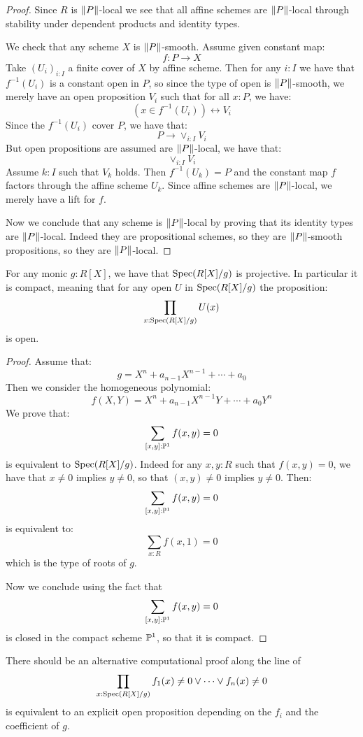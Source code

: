 \begin{proof}
Since $R$ is $\lVert P \rVert$-local we see that all affine schemes are $\lVert P \rVert$-local through stability under dependent products and identity types.

We check that any scheme $X$ is $\lVert P \rVert$-smooth. Assume given constant map:
\[f:P\to X\]
Take $(U_i)_{i:I}$ a finite cover of $X$ by affine scheme. Then for any $i:I$ we have that $f^{-1}(U_i)$ is a constant open in $P$, so since the type of open is $\lVert P \rVert$-smooth, we merely have an open proposition $V_i$ such that for all $x:P$, we have:
\[(x\in f^{-1}(U_i) )\leftrightarrow V_i\]
Since the $f^{-1}(U_i)$ cover $P$, we have that:
\[P\to \lor_{i:I} V_i\]
But open propositions are assumed are $\lVert P \rVert$-local, we have that:
\[ \lor_{i:I} V_i\]
Assume $k:I$ such that $V_k$ holds. Then $f^{-1}(U_k) = P$ and the constant map $f$ factors through the affine scheme $U_k$. Since affine schemes are $\lVert P \rVert$-local, we merely have a lift for $f$.

Now we conclude that any scheme is $\lVert P \rVert$-local by proving that its identity types are $\lVert P \rVert$-local. Indeed they are propositional schemes, so they are $\lVert P \rVert$-smooth propositions, so they are $\lVert P \rVert$-local.
\end{proof}

\begin{lemma}\label{roots-monic-proper}
For any monic $g:R[X]$, we have that $\operatorname{Spec}(R[X]/g)$ is projective. In particular it is compact, meaning that for any open $U$ in $\operatorname{Spec}(R[X]/g)$ the proposition:
\[\prod_{x:\operatorname{Spec}(R[X]/g)}U(x)\]
is open.
\end{lemma}

\begin{proof}
Assume that:
\[g=X^n+a_{n-1}X^{n-1}+\cdots+a_0\]
Then we consider the homogeneous polynomial:
\[f(X,Y) = X^n + a_{n-1}X^{n-1}Y+\cdots+a_0Y^n\]
We prove that:
\[\sum_{[x,y]:\mathbb{P}^1}f(x,y) = 0\]
is equivalent to $\operatorname{Spec}(R[X]/g)$. Indeed for any $x,y:R$ such that $f(x,y)=0$, we have that $x\not=0$ implies $y\not=0$, so that $(x,y)\not=0$ implies $y\not=0$. Then:
\[\sum_{[x,y]:\mathbb{P}^1}f(x,y) = 0\]
is equivalent to:
\[\sum_{x:R} f(x,1)=0\]
which is the type of roots of $g$. 

Now we conclude using the fact that 
\[\sum_{[x,y]:\mathbb{P}^1}f(x,y) = 0\]
is closed in the compact scheme $\mathbb{P}^1$, so that it is compact.
\end{proof}

\begin{remark}
There should be an alternative computational proof along the line of 
\[\prod_{x:\operatorname{Spec}(R[X]/g)}f_1(x)\not=0\lor\cdots\lor f_n(x)\not=0\]
is equivalent to an explicit open proposition depending on the $f_i$ and the coefficient of $g$.
\end{remark}

